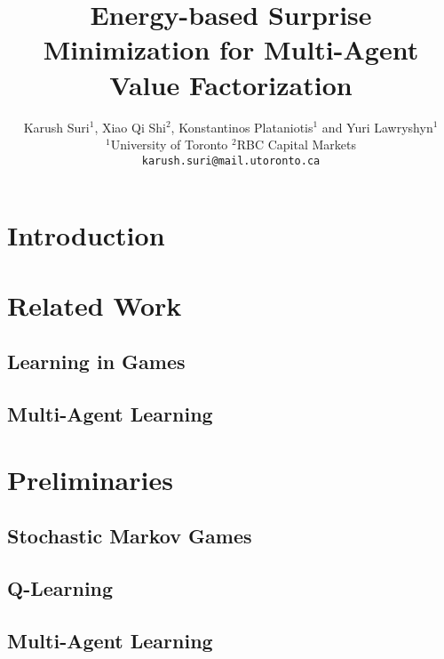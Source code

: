 \documentclass{article}
\title{Energy-based Surprise Minimization for Multi-Agent Value Factorization}
\author{
  Karush Suri$^{1}$, Xiao Qi Shi$^{2}$, Konstantinos Plataniotis$^{1}$ and Yuri Lawryshyn$^{1}$\\
   $^{1}$University of Toronto $^{2}$RBC Capital Markets\\
  \texttt{karush.suri@mail.utoronto.ca}
}
\begin{document}
\maketitle

\begin{abstract}

\end{abstract}

\begin{multicols}{2}

\section{Introduction}


\section{Related Work}

\subsection{Learning in Games}

\subsection{Multi-Agent Learning}


\section{Preliminaries}

\subsection{Stochastic Markov Games}

\subsection{Q-Learning}

\subsection{Multi-Agent Learning}



\end{multicols}
\end{document}
